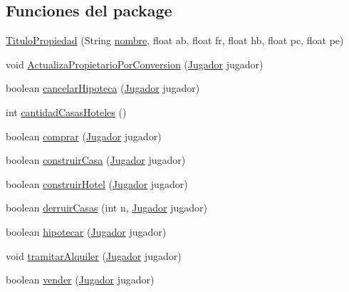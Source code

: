 \subsection*{Funciones del \textquotesingle{}package\textquotesingle{}}
\begin{DoxyCompactItemize}
\item 
\hyperlink{classcivitas_1_1TituloPropiedad_ace9e509977e1a3df5ee0cab4cc150622}{Titulo\+Propiedad} (String \hyperlink{classcivitas_1_1TituloPropiedad_a7542ca29c4635b8cb3c56558ed7c5096}{nombre}, float ab, float fr, float hb, float pc, float pe)
\item 
void \hyperlink{classcivitas_1_1TituloPropiedad_a4f7d2ebddd0012032245a7e1c52b6334}{Actualiza\+Propietario\+Por\+Conversion} (\hyperlink{classcivitas_1_1Jugador}{Jugador} jugador)
\item 
boolean \hyperlink{classcivitas_1_1TituloPropiedad_a85a5b8fcd43a0dd67b4700e8bc6dd969}{cancelar\+Hipoteca} (\hyperlink{classcivitas_1_1Jugador}{Jugador} jugador)
\item 
int \hyperlink{classcivitas_1_1TituloPropiedad_ab7971a3c2b326c05da54da18c4f12f4b}{cantidad\+Casas\+Hoteles} ()
\item 
boolean \hyperlink{classcivitas_1_1TituloPropiedad_a4facb90267225f5e279424e679e5ac8d}{comprar} (\hyperlink{classcivitas_1_1Jugador}{Jugador} jugador)
\item 
boolean \hyperlink{classcivitas_1_1TituloPropiedad_a3a335481d7f8cb2c675746d9e87f9b1b}{construir\+Casa} (\hyperlink{classcivitas_1_1Jugador}{Jugador} jugador)
\item 
boolean \hyperlink{classcivitas_1_1TituloPropiedad_a037ce8da6a29efc2001bb800297b80a5}{construir\+Hotel} (\hyperlink{classcivitas_1_1Jugador}{Jugador} jugador)
\item 
boolean \hyperlink{classcivitas_1_1TituloPropiedad_a61e1dfd0ba431e4ae30c459f93b0c343}{derruir\+Casas} (int n, \hyperlink{classcivitas_1_1Jugador}{Jugador} jugador)
\item 
boolean \hyperlink{classcivitas_1_1TituloPropiedad_ae09a294437e56818a913612ec6f835ed}{hipotecar} (\hyperlink{classcivitas_1_1Jugador}{Jugador} jugador)
\item 
void \hyperlink{classcivitas_1_1TituloPropiedad_a1147fd3806f6425bf3b8ed802e670e9f}{tramitar\+Alquiler} (\hyperlink{classcivitas_1_1Jugador}{Jugador} jugador)
\item 
boolean \hyperlink{classcivitas_1_1TituloPropiedad_aec443566c1a6c671d2f23054efae091e}{vender} (\hyperlink{classcivitas_1_1Jugador}{Jugador} jugador)
\item 

\end{DoxyCompactItemize}
